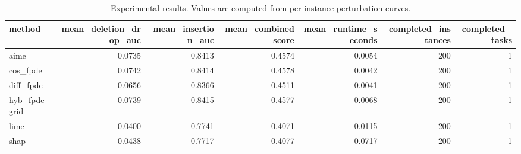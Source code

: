 \begin{table}[t]
\caption{Experimental results. Values are computed from per-instance perturbation curves.}
\label{tab:main_results_computed}
\centering
\begin{tabular}{lrrrrrr}
\toprule
method & mean\_deletion\_drop\_auc & mean\_insertion\_auc & mean\_combined\_score & mean\_runtime\_seconds & completed\_instances & completed\_tasks \\
\midrule
aime & 0.0735 & 0.8413 & 0.4574 & 0.0054 & 200 & 1 \\
cos\_fpde & 0.0742 & 0.8414 & 0.4578 & 0.0042 & 200 & 1 \\
diff\_fpde & 0.0656 & 0.8366 & 0.4511 & 0.0041 & 200 & 1 \\
hyb\_fpde\_grid & 0.0739 & 0.8415 & 0.4577 & 0.0068 & 200 & 1 \\
lime & 0.0400 & 0.7741 & 0.4071 & 0.0115 & 200 & 1 \\
shap & 0.0438 & 0.7717 & 0.4077 & 0.0717 & 200 & 1 \\
\bottomrule
\end{tabular}

\end{table}
